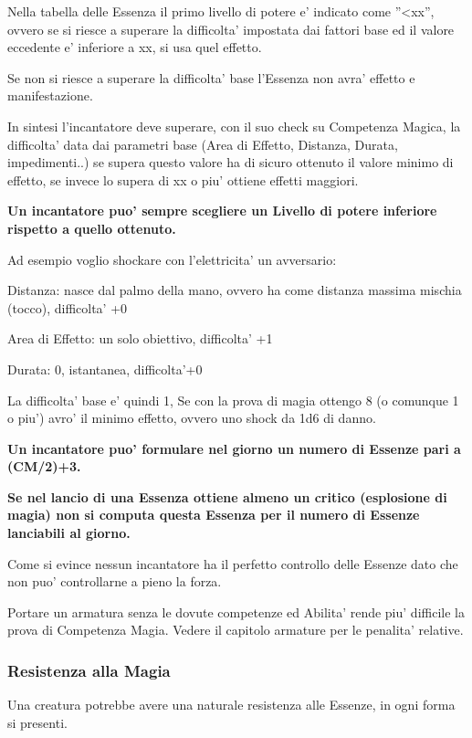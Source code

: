 \documentclass[a4paper,11pt,twoside,openany]{book}
\begin{document}
Nella tabella delle Essenza il primo livello di potere e' indicato come ''\textless xx'', ovvero se si riesce a superare la difficolta' impostata dai fattori base ed il valore eccedente e' inferiore a xx, si usa quel effetto.

Se non si riesce a superare la difficolta' base l'Essenza non avra' effetto e manifestazione.

In sintesi l'incantatore deve superare, con il suo check su Competenza Magica, la difficolta' data dai parametri base (Area di Effetto, Distanza, Durata, impedimenti..) se supera questo valore ha di sicuro ottenuto il valore minimo di effetto, se invece lo supera di xx o piu' ottiene effetti maggiori.

\bigskip

 \textbf{Un incantatore puo' sempre scegliere un Livello di potere
inferiore rispetto a quello ottenuto.}

Ad esempio voglio shockare con l'elettricita' un avversario:

Distanza: nasce dal palmo della mano, ovvero ha come distanza massima mischia (tocco), difficolta' +0

Area di Effetto: un solo obiettivo, difficolta' +1

Durata: 0, istantanea, difficolta'+0

La difficolta' base e' quindi 1, Se con la prova di magia ottengo 8 (o comunque 1 o piu') avro' il minimo effetto, ovvero uno shock da 1d6 di danno.

\bigskip

\textbf{Un incantatore puo' formulare nel giorno un numero di Essenze pari a (CM/2)+3.}

\textbf{Se nel lancio di una Essenza ottiene almeno un critico (esplosione di magia) non si computa questa Essenza per il numero di Essenze lanciabili al giorno.}

Come si evince nessun incantatore ha il perfetto controllo delle Essenze dato che non puo' controllarne a pieno la forza.

Portare un armatura senza le dovute competenze ed Abilita' rende piu' difficile la prova di Competenza Magia. Vedere il capitolo armature per le penalita' relative.

\subsubsection{Resistenza alla Magia}

Una creatura potrebbe avere una naturale resistenza alle Essenze, in ogni forma si presenti.
\end{document}
